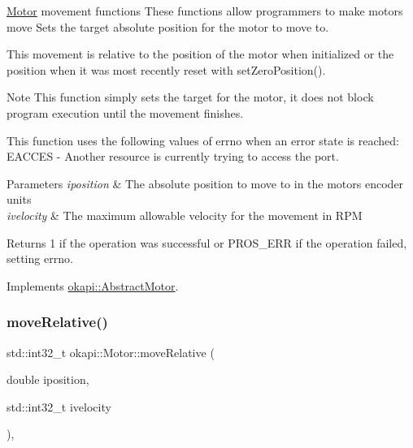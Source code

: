 \mbox{\hyperlink{classokapi_1_1Motor}{Motor}} movement functions These functions allow programmers to make motors move Sets the target absolute position for the motor to move to.

This movement is relative to the position of the motor when initialized or the position when it was most recently reset with set\+Zero\+Position().

\begin{DoxyNote}{Note}
This function simply sets the target for the motor, it does not block program execution until the movement finishes.
\end{DoxyNote}
This function uses the following values of errno when an error state is reached\+: E\+A\+C\+C\+ES -\/ Another resource is currently trying to access the port.


\begin{DoxyParams}{Parameters}
{\em iposition} & The absolute position to move to in the motor\textquotesingle{}s encoder units \\
\hline
{\em ivelocity} & The maximum allowable velocity for the movement in R\+PM \\
\hline
\end{DoxyParams}
\begin{DoxyReturn}{Returns}
1 if the operation was successful or P\+R\+O\+S\+\_\+\+E\+RR if the operation failed, setting errno. 
\end{DoxyReturn}


Implements \mbox{\hyperlink{classokapi_1_1AbstractMotor_ab84ff0f3e39fa14dcf74bcc867863ff8}{okapi\+::\+Abstract\+Motor}}.

\mbox{\label{classokapi_1_1Motor_a40f6f70ed9b12d1834551d1232303ef1}} 
\subsubsection{\texorpdfstring{moveRelative()}{moveRelative()}}
{\footnotesize\ttfamily std\+::int32\+\_\+t okapi\+::\+Motor\+::move\+Relative (\begin{DoxyParamCaption}\item[{double}]{iposition,  }\item[{std\+::int32\+\_\+t}]{ivelocity }\end{DoxyParamCaption})\hspace{0.3cm}{\ttfamily [override]}, {\ttfamily [virtual]}}

